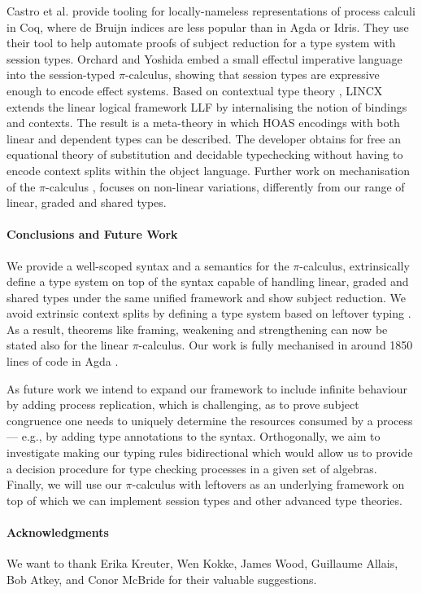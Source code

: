 \documentclass[runningheads]{llncs}
\newcommand{\picalc}{$\pi$-calculus}
\begin{document}
Castro et al. \cite{Castro2020} provide tooling for locally-nameless representations of process calculi in Coq, where de Bruijn indices are less popular than in Agda or Idris.
They use their tool to help automate proofs of subject reduction for a type system with session types.
%
Orchard and Yoshida \cite{OrchardY16} embed a small effectul imperative language into the session-typed \picalc{}, showing that session types are expressive enough to encode effect systems.
%
Based on contextual type theory \cite{Pientkaa,Pientka}, LINCX \cite{Georges2017} extends the linear logical framework LLF \cite{Cervesato1996} by internalising the notion of bindings and contexts.
The result is a meta-theory in which HOAS encodings with both linear and dependent types can be described.
The developer obtains for free an equational theory of substitution and decidable typechecking without having to encode context splits within the object language.
%
Further work on mechanisation of the \picalc{} \cite{Henry-Gerard1999,Honsell2001a,Bengtson2013,Despeyroux2000,Affeldt2008}, focuses on non-linear variations, differently from our range of linear, graded and shared types.

\paragraph*{Conclusions and Future Work}

We provide a well-scoped syntax and a semantics for the \picalc{}, extrinsically define a type system on top of the syntax capable of handling linear, graded and shared types under the same unified framework and show subject reduction.
We avoid extrinsic context splits by defining a type system based on leftover typing \cite{Allais2018a}.
As a result, theorems like framing, weakening and strengthening can now be stated also for the linear \picalc{}.
Our work is fully mechanised in around 1850 lines of code in Agda \cite{Zalakain2020Agda}.

As future work we intend to expand our framework to include infinite behaviour by adding process replication, which is challenging, as to prove subject congruence one needs to uniquely determine the resources consumed by a process --- e.g., by adding type annotations to the syntax.
Orthogonally, we aim to investigate making our typing rules bidirectional which would allow us to provide a decision procedure for type checking processes in a given set of algebras.
Finally, we will use our \picalc{} with leftovers as an underlying framework on top of which we can implement session types and other advanced type theories.

\paragraph*{Acknowledgments}

We want to thank Erika Kreuter, Wen Kokke, James Wood, Guillaume Allais, Bob Atkey, and Conor McBride for their valuable suggestions.

\clearpage



\clearpage
\appendix
\changetext{}{10em}{-5em}{-5em}{}
\end{document}
